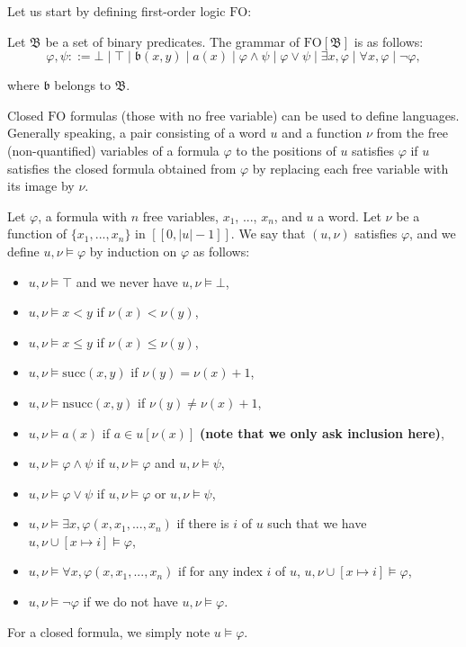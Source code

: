 \documentclass[a4paper,UKenglish,cleveref, autoref, thm-restate]{lipics-v2021}
\newcommand{\FO}{\mathrm{FO}}
\renewcommand{\succ}{\mathrm{succ}}
\renewcommand{\nsucc}{\mathrm{nsucc}}
\newcommand{\val}{\nu}
\newcommand{\bin}{\mathfrak{B}}
\renewcommand{\b}{\mathfrak{b}}
\begin{document}
Let us start by defining first-order logic $\FO$:

\begin{definition}
    Let $\bin$ be a set of binary predicates. The grammar of $\FO[\bin]$ is as follows:
    $$\varphi, \psi::= \bot \mid \top \mid \b(x,y) \mid a(x) \mid \varphi \land \psi \mid \varphi \lor \psi \mid \exists x, \varphi \mid \forall x, \varphi \mid  \neg \varphi,$$

    where $\b$ belongs to $\bin$.
\end{definition}



Closed $\FO$ formulas (those with no free variable) can be used to define languages. Generally speaking, a pair consisting of a word $u$ and a function $\val$ from the free (non-quantified) variables of a formula $\varphi$ to the positions of $u$ satisfies $\varphi$ if $u$ satisfies the closed formula obtained from $\varphi$ by replacing each free variable with its image by $\val$.


\begin{definition}
    Let $\varphi$, a formula with $n$ free variables, $x_1$, ..., $x_n$, and $u$ a word. Let $\val$ be a function of $\{x_1,...,x_n\}$ in $[\![0,|u|-1]\!]$. We say that $(u,\val)$ satisfies $\varphi$, and we define $u,\val \models \varphi$ by induction on $\varphi$ as follows:
    \begin{itemize}
        \item $u,\val \models \top$ and we never have $u, \val \models \bot$,
        \item $u, \val \models x < y$ if $\val(x) < \val(y)$,
        \item $u, \val \models x \leq y$ if $\val(x) \leq \val(y)$,
        \item $u, \val \models \succ(x,y)$ if $\val(y) = \val(x)+1$,
        \item $u, \val \models \nsucc(x,y)$ if $\val(y) \neq \val(x)+1$,
        \item $u, \val \models a(x)$ if $a \in u[\val(x)]$ \textbf{(note that we only ask inclusion here)},
        \item $u, \val \models \varphi \land \psi$ if $u, \val \models \varphi$ and $u, \val \models \psi$,
        \item $u, \val \models \varphi \lor \psi$ if $u, \val \models \varphi$ or $u, \val \models \psi$,
        \item $u, \val \models \exists x, \varphi(x,x_1,...,x_n)$ if there is $i$ of $u$ such that we have $u, \val \cup [x \mapsto i] \models \varphi$,
        \item $u, \val \models \forall x, \varphi(x,x_1,...,x_n)$ if for any index $i$ of $u$, $u, \val \cup [x \mapsto i] \models \varphi$,
        \item $u,\val \models \neg \varphi$ if we do not have $u,\val \models \varphi$.
    \end{itemize}

    For a closed formula, we simply note $u \models \varphi$.
\end{definition}
\end{document}
